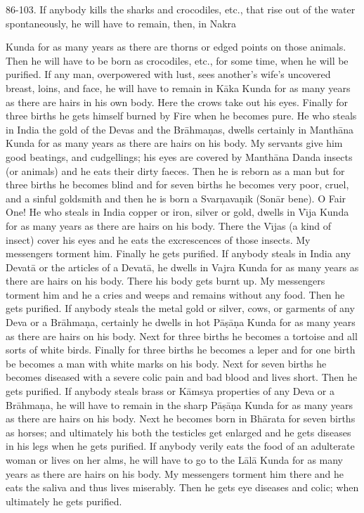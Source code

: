 86-103. If anybody kills the sharks and crocodiles, etc., that rise out of the water spontaneously, he will have to remain, then, in Nakra

Kunda for as many years as there are thorns or edged points on those animals. Then he will have to be born as crocodiles, etc., for some time, when he will be purified. If any man, overpowered with lust, sees another's wife's uncovered breast, loins, and face, he will have to remain in K\=aka Kunda for as many years as there are hairs in his own body. Here the crows take out his eyes. Finally for three births he gets himself burned by Fire when he becomes pure. He who steals in India the gold of the Devas and the Br\=ahma\d{n}as, dwells certainly in Manth\=ana Kunda for as many years as there are hairs on his body. My servants give him good beatings, and cudgellings; his eyes are covered by Manth\=ana Danda insects (or animals) and he eats their dirty faeces. Then he is reborn as a man but for three births he becomes blind and for seven births he becomes very poor, cruel, and a sinful goldsmith and then he is born a Svar\d{n}ava\d{n}ik (Son\=ar bene). O Fair One! He who steals in India copper or iron, silver or gold, dwells in V\={\i}ja Kunda for as many years as there are hairs on his body. There the V\={\i}jas (a kind of insect) cover his eyes and he eats the excrescences of those insects. My messengers torment him. Finally he gets purified. If anybody steals in India any Devat\=a or the articles of a Devat\=a, he dwells in Vajra Kunda for as many years as there are hairs on his body. There his body gets burnt up. My messengers torment him and he a cries and weeps and remains without any food. Then he gets purified. If anybody steals the metal gold or silver, cows, or garments of any Deva or a Br\=ahma\d{n}a, certainly he dwells in hot P\=a\d{s}\=a\d{n}a Kunda for as many years as there are hairs on his body. Next for three births he becomes a tortoise and all sorts of white birds. Finally for three births he becomes a leper and for one birth be becomes a man with white marks on his body. Next for seven births he becomes diseased with a severe colic pain and bad blood and lives short. Then he gets purified. If anybody steals brass or K\=amsya properties of any Deva or a Br\=ahma\d{n}a, he will have to remain in the sharp P\=a\d{s}\=a\d{n}a Kunda for as many years as there are hairs on his body. Next he becomes born in Bh\=arata for seven births as horses; and ultimately his both the testicles get enlarged and he gets diseases in his legs when he gets purified. If anybody verily eats the food of an adulterate woman or lives on her alms, he will have to go to the L\=al\=a Kunda for as many years as there are hairs on his body. My messengers torment him there and he eats the saliva and thus lives miserably. Then he gets eye diseases and colic; when ultimately he gets purified.

